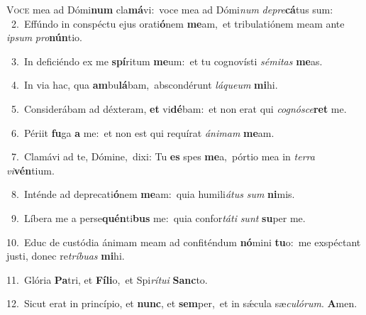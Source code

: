 \lettrine{\initial\textcolor{\initialcolor}{V}}{oce} mea ad Dómi\textbf{num} cla\-\textbf{má}\-vi:~\star voce mea ad Dómi\textit{num} \textit{de}\-\textit{pre}\textbf{cá}tus sum:\\
{\numbfont\textcolor{\numbcolor}{~2.}}~Effúndo in conspéctu ejus orati\-\textbf{ó}\-nem \textbf{me}\-am,~\star et tribulatiónem meam ante \textit{ip}\-\textit{sum} \textit{pro}\-\textbf{nún}tio.\par
{\numbfont\textcolor{\numbcolor}{~3.}}~In deficiéndo ex me \textbf{spí}\-ritum \textbf{me}\-um:~\star et tu cognovísti \textit{sé}\-\textit{mi}\textit{tas} \textbf{me}\-as.\par
{\numbfont\textcolor{\numbcolor}{~4.}}~In via hac, qua \textbf{am}\-bu\-\textbf{lá}\-bam,~\star abscondérunt \textit{lá}\-\textit{que}\textit{um} \textbf{mi}\-hi.\par
{\numbfont\textcolor{\numbcolor}{~5.}}~Considerábam ad déxteram, \textbf{et} vi\-\textbf{dé}\-bam:~\star et non erat qui \textit{co}\-\textit{gnó}\textit{sce}\textbf{ret} me.\par
{\numbfont\textcolor{\numbcolor}{~6.}}~Périit \textbf{fu}\-ga \textbf{a} me:~\star et non est qui requírat \textit{á}\-\textit{ni}\textit{mam} \textbf{me}\-am.\par
{\numbfont\textcolor{\numbcolor}{~7.}}~Clamávi ad te, Dómine,~\dagger dixi: Tu \textbf{es} spes \textbf{me}\-a,~\star pórtio mea in \textit{ter}\-\textit{ra} \textit{vi}\-\textbf{vén}tium.\par
{\numbfont\textcolor{\numbcolor}{~8.}}~Inténde ad deprecati\-\textbf{ó}\-nem \textbf{me}\-am:~\star quia humili\-\textit{á}\-\textit{tus} \textit{sum} \textbf{ni}\-mis.\par
{\numbfont\textcolor{\numbcolor}{~9.}}~Líbera me a perse\-\textbf{quén}\-ti\textbf{bus} me:~\star quia confor\-\textit{tá}\-\textit{ti} \textit{sunt} \textbf{su}\-per me.\par
{\numbfont\textcolor{\numbcolor}{10.}}~Educ de custódia ánimam meam ad confiténdum \textbf{nó}\-mini \textbf{tu}\-o:~\star me exspéctant justi, donec re\-\textit{trí}\-\textit{bu}\textit{as} \textbf{mi}\-hi.\par
{\numbfont\textcolor{\numbcolor}{11.}}~Glória \textbf{Pa}\-tri, et \textbf{Fí}\-\textbf{li}o,~\star et Spi\-\textit{rí}\-\textit{tu}\textit{i} \textbf{Sanc}\-to.\par
{\numbfont\textcolor{\numbcolor}{12.}}~Sicut erat in princípio, et \textbf{nunc}\-, et \textbf{sem}\-per,~\star et in sǽcula sæ\-\textit{cu}\-\textit{ló}\textit{rum}. \textbf{A}\-men.\par
